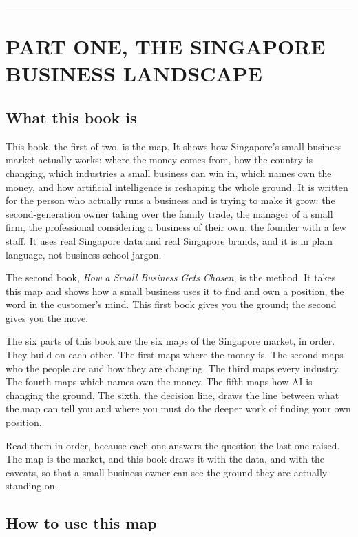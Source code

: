 \documentclass[10pt,twoside,openany]{memoir}
\begin{document}
\begin{center}\rule{0.5\linewidth}{0.5pt}\end{center}

\part{PART ONE, THE SINGAPORE BUSINESS
LANDSCAPE}\label{part-one-the-singapore-business-landscape}

\FloatBarrier
\chapter{What this book is}\label{what-this-book-is}

This book, the first of two, is the map. It shows how Singapore's small
business market actually works: where the money comes from, how the
country is changing, which industries a small business can win in, which
names own the money, and how artificial intelligence is reshaping the
whole ground. It is written for the person who actually runs a business
and is trying to make it grow: the second-generation owner taking over
the family trade, the manager of a small firm, the professional
considering a business of their own, the founder with a few staff. It
uses real Singapore data and real Singapore brands, and it is in plain
language, not business-school jargon.

The second book, \emph{How a Small Business Gets Chosen}, is the method.
It takes this map and shows how a small business uses it to find and own
a position, the word in the customer's mind. This first book gives you
the ground; the second gives you the move.

The six parts of this book are the six maps of the Singapore market, in
order. They build on each other. The first maps where the money is. The
second maps who the people are and how they are changing. The third maps
every industry. The fourth maps which names own the money. The fifth
maps how AI is changing the ground. The sixth, the decision line, draws
the line between what the map can tell you and where you must do the
deeper work of finding your own position.

Read them in order, because each one answers the question the last one
raised. The map is the market, and this book draws it with the data, and
with the caveats, so that a small business owner can see the ground they
are actually standing on.

\FloatBarrier
\chapter{How to use this map}\label{how-to-use-this-map}
\end{document}
